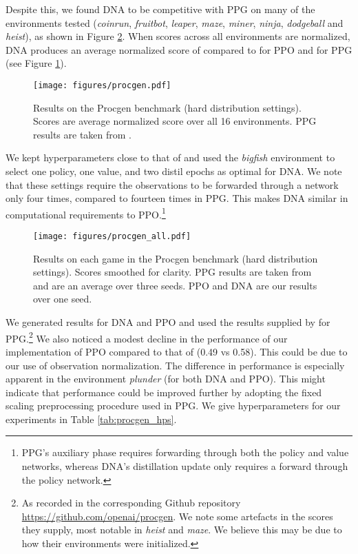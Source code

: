 \documentclass{article}
\begin{document}
Despite this, we found DNA to be competitive with PPG on many of the environments tested (\textit{coinrun}, \textit{fruitbot}, \textit{leaper}, \textit{maze}, \textit{miner}, \textit{ninja}, \textit{dodgeball} and \textit{heist}), as shown in Figure \ref{fig:procgen_all}. When scores across all environments are normalized, DNA produces an average normalized score of  compared to  for PPO and  for PPG (see Figure \ref{fig:procgen}). 

\begin{figure}[h]
    \centering
    \texttt{[image: figures/procgen.pdf]}
    \caption{Results on the Procgen benchmark (hard distribution settings). Scores are average normalized score over all 16 environments. PPG results are taken from \cite{cobbe2021phasic}.}
    \label{fig:procgen}
\end{figure}

We kept hyperparameters close to that of \cite{cobbe2021phasic} and used the \textit{bigfish} environment to select one policy, one value, and two distil epochs as optimal for DNA. We note that these settings require the observations to be forwarded through a network only four times, compared to fourteen times in PPG. This makes DNA similar in computational requirements to PPO.\footnote{PPG's auxiliary phase requires forwarding through both the policy and value networks, whereas DNA's distillation update only requires a forward through the policy network.}

\begin{figure}[h]
    \centering
    \texttt{[image: figures/procgen\_all.pdf]}
    \caption{Results on each game in the Procgen benchmark (hard distribution settings). Scores smoothed for clarity. PPG results are taken from \cite{cobbe2021phasic} and are an average over three seeds. PPO and DNA are our results over one seed.}
    \label{fig:procgen_all}
\end{figure}

We generated results for DNA and PPO and used the results supplied by \cite{cobbe2021phasic} for PPG.\footnote{As recorded in the corresponding Github repository \url{https://github.com/openai/procgen}. We note some artefacts in the scores they supply, most notable in \textit{heist} and \textit{maze}. We believe this may be due to how their environments were initialized.} We also noticed a modest decline in the performance of our implementation of PPO compared to that of \cite{cobbe2021phasic} (0.49 vs 0.58). This could be due to our use of observation normalization. The difference in performance is especially apparent in the environment \textit{plunder} (for both DNA and PPO). This might indicate that performance could be improved further by adopting the fixed scaling preprocessing procedure used in PPG. We give hyperparameters for our experiments in Table \ref{tab:procgen_hps}.
\end{document}
